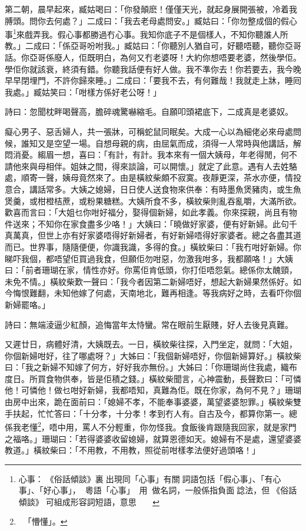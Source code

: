 \documentclass[a5paper, 12pt, openany]{book} %
\begin{document}
	第二朝，晨早起來，臧姑喝曰：「你發顛麽！僅僅天光，就起身展開張被，冷着我膊頭。問你去何處？」二成曰：「我去老母處問安。」臧姑曰：「你勿整成個的假心事\footnote{心事：󱪙《俗話傾談》裏󰊺出現同「心事」有關󱝚詞語包括「假心事」、「有心事」、「好心事」，󱛖󱀱粵語「心事」用󰹚做名詞，一般係指負面󱝚諗法，但󱪙《俗話傾談》󱀥可組成形容詞短語，意思𠄡一定負面。}來戲弄我。假心事都勝過冇心事。我知你底子不是個樣人，不知你聽誰人所教。」二成曰：「係亞哥吩咐我。」臧姑曰：「你聽別人猶自可，好聽唔聽，聽你亞哥話。你亞哥係廢人，佢既明白，為何又冇老婆呀！大約你想唔要老婆，然後學佢。學佢你就該衰，終須有錯。你聽我話便有好人做。我不準你去！你若要去，我今晚早早閉埋門，不許你歸來睡。」二成曰：「要我不去，有何難哉！我就走上牀，睡囘我處。」臧姑笑曰：「咁樣方係好老公呀！」

	詩曰：忽聞枕畔喝聲高，膽碎魂驚嚇縮毛。自願叩頭裙底下，二成真是老婆奴。

	癡心男子、惡舌婦人，共一張牀，可稱蛇鼠同眠矣。大成一心以為細佬必來母處問候，誰知又是空望一場。自想母親的病，由屈氣而成，須得一人常時與他講話，解悶消憂。縐眉一想，喜曰：「有計，有計。我本來有一個大姨母，年老得閒，何不請他來與母相伴。姐妹之間，得來談論，可以開懷。」就定了此意。遇有人去姓駱處，順寄一聲，姨母竟然來了。由是橫紋柴頗不寂寞。夜靜更深，茶水亦便，情投意合，講話常多。大姨之媳婦，日日使人送食物來供奉：有時墨魚煲豬肉，或生魚煲羹，或柑橙桔蔗，或粉果糖糕。大姨所食不多，橫紋柴則亂吞亂嚼，大滿所欲。歡喜而言曰：「大姐乜你咁好福分，娶得個新婦，如此孝義。你來探親，尚且有物件送來；不知你在家食盡多少咯！」大姨曰：「曉做好家婆，便有好新婦。此句千真萬真，但世上亦有好家婆唔得好新婦者，有好新婦唔得好家婆者。總之各盡其道而已。世界事，隨隨便便，你識我識，多得的食。」橫紋柴曰：「我冇咁好新婦。你睇吓我個，都唔望佢買過我食，但願佢勿咁惡，勿激我咁多，我都願咯！」大姨曰：「前者珊瑚在家，情性亦好。你罵佢肯低頭，你打佢唔怨氣。總係你太醜頸，未免不情。」橫紋柴歎一聲曰：「我今者因第二新婦唔好，想起大新婦果然係好。如今悔恨難翻，未知他嫁了何處，天南地北，難再相逢。等我病好之時，去看吓你個新婦罷咯。」

	詩曰：無端淩逼少紅顏，追悔當年太恃蠻。常在眼前生厭賤，好人去後見真難。

	又遲廿日，病體好清，大姨既去。一日，橫紋柴往探，入門坐定，就問：「大姐，你個新婦咁好，往了哪處呀？」大姊曰：「我個新婦唔好，你個新婦算好。」橫紋柴曰：「我之新婦不知嫁了何方，好好我亦無份。」大姊曰：「你珊瑚尚住我處，織布度日。所買食物供奉，皆是佢積之錢。」橫紋柴聞言，心神震動，長聲歎曰：「可憐他！可憐他！做乜咁好新婦，我都唔知，真難為佢。既在你家，為何不見？」珊瑚由房中出來，跪在面前曰：「媳婦不孝，不能奉事婆婆，萬望婆婆恕罪。」橫紋柴雙手扶起，忙忙答曰：「十分孝，十分孝！孝到冇人有。自古及今，都算你第一。總係我老懂\footnote{「懵懂」。}，唔中用，罵人不分輕重，你勿怪我。食飯後肯跟隨我回家，就是家門之福咯。」珊瑚曰：「若得婆婆收留媳婦，就算恩德如天。媳婦有不是處，還望婆婆教道。」橫紋柴曰：「不用教，不用教，照從前咁樣孝法便好過頭咯！」
\end{document}
